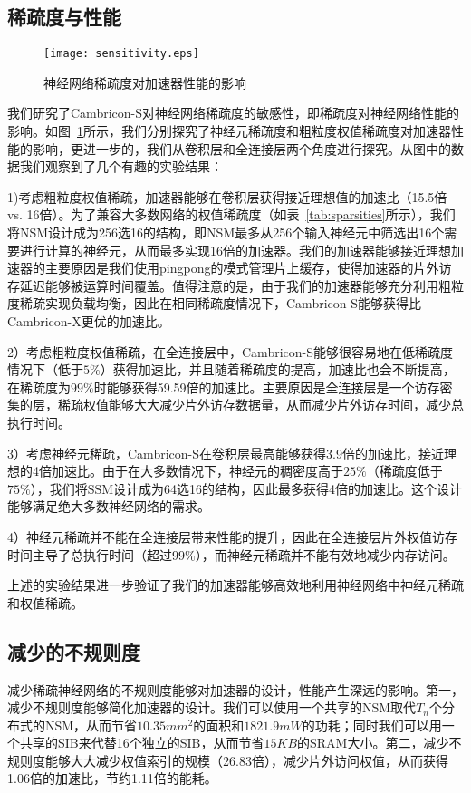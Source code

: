 \subsection{稀疏度与性能}
\begin{figure}[h]
\centering
\texttt{[image: sensitivity.eps]}
\caption{神经网络稀疏度对加速器性能的影响}
\label{fig:sensitivity}
\end{figure}

我们研究了Cambricon-S对神经网络稀疏度的敏感性，即稀疏度对神经网络性能的影响。如图~\ref{fig:sensitivity}所示，我们分别探究了神经元稀疏度和粗粒度权值稀疏度对加速器性能的影响，更进一步的，我们从卷积层和全连接层两个角度进行探究。从图中的数据我们观察到了几个有趣的实验结果：

1)考虑粗粒度权值稀疏，加速器能够在卷积层获得接近理想值的加速比（15.5倍 vs. 16倍）。为了兼容大多数网络的权值稀疏度（如表~\ref{tab:sparsities}所示），我们将NSM设计成为256选16的结构，即NSM最多从256个输入神经元中筛选出16个需要进行计算的神经元，从而最多实现16倍的加速器。我们的加速器能够接近理想加速器的主要原因是我们使用pingpong的模式管理片上缓存，使得加速器的片外访存延迟能够被运算时间覆盖。值得注意的是，由于我们的加速器能够充分利用粗粒度稀疏实现负载均衡，因此在相同稀疏度情况下，Cambricon-S能够获得比Cambricon-X更优的加速比。

2）考虑粗粒度权值稀疏，在全连接层中，Cambricon-S能够很容易地在低稀疏度情况下（低于$5\%$）获得加速比，并且随着稀疏度的提高，加速比也会不断提高，在稀疏度为$99\%$时能够获得59.59倍的加速比。主要原因是全连接层是一个访存密集的层，稀疏权值能够大大减少片外访存数据量，从而减少片外访存时间，减少总执行时间。

3）考虑神经元稀疏，Cambricon-S在卷积层最高能够获得3.9倍的加速比，接近理想的4倍加速比。由于在大多数情况下，神经元的稠密度高于$25\%$（稀疏度低于$75\%$），我们将SSM设计成为64选16的结构，因此最多获得4倍的加速比。这个设计能够满足绝大多数神经网络的需求。

4）神经元稀疏并不能在全连接层带来性能的提升，因此在全连接层片外权值访存时间主导了总执行时间（超过$99\%$），而神经元稀疏并不能有效地减少内存访问。

上述的实验结果进一步验证了我们的加速器能够高效地利用神经网络中神经元稀疏和权值稀疏。

\subsection{减少的不规则度}
减少稀疏神经网络的不规则度能够对加速器的设计，性能产生深远的影响。第一，减少不规则度能够简化加速器的设计。我们可以使用一个共享的NSM取代$T_n$个分布式的NSM，从而节省$10.35mm^2$的面积和$1821.9mW$的功耗；同时我们可以用一个共享的SIB来代替16个独立的SIB，从而节省$15KB$的SRAM大小。第二，减少不规则度能够大大减少权值索引的规模（26.83倍），减少片外访问权值，从而获得1.06倍的加速比，节约1.11倍的能耗。

